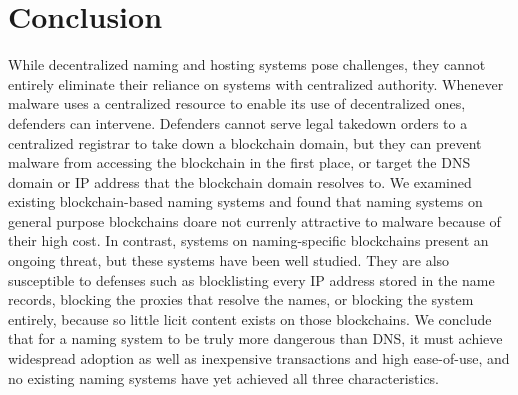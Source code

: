\section{Conclusion}
\label{sec:conclusion}

While decentralized naming and hosting systems pose challenges, they cannot 
entirely 
eliminate their reliance on systems with centralized authority. Whenever 
malware uses a centralized 
resource to enable its use of decentralized ones, defenders can intervene. 
Defenders cannot serve 
legal takedown orders to a centralized registrar to take 
down a blockchain domain, but they can prevent malware from accessing the 
blockchain in the first 
place, or target the DNS domain or IP address that the blockchain domain 
resolves to. We examined existing blockchain-based naming systems and found 
that naming systems on general purpose blockchains doare not 
currenly attractive to malware because of their high cost. In 
contrast, systems on naming-specific blockchains present an 
ongoing threat, but these systems have 
been well studied. They are also susceptible 
to defenses such as 
blocklisting every IP address stored in the name records, 
blocking the proxies that resolve the names, or blocking 
the system entirely, because so little licit 
content exists on those blockchains. We conclude that for a naming system to be 
truly more dangerous than DNS, it must achieve widespread 
adoption as well as inexpensive transactions and high 
ease-of-use, and no existing naming systems have yet achieved 
all three characteristics. 